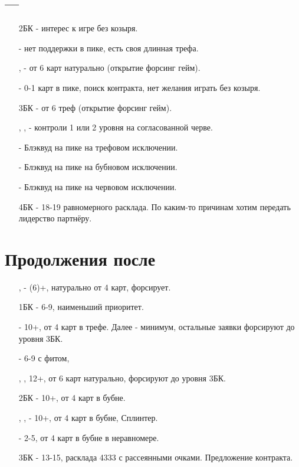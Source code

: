 \documentclass{article}
\begin{document}
\subsection{ --- }
\begin{enumerate}
    \item[2БК] - интерес к игре без козыря.
    \item[\cl{3}] - нет поддержки в пике, есть своя длинная трефа.
    \item[\di{3}, \he{3}] - от 6 карт натурально (открытие форсинг гейм).
    \item[\sp{3}] - 0-1 карт в пике, поиск контракта, нет желания играть без козыря.
    \item[3БК] - от 6 треф (открытие форсинг гейм).
    \item[\cl{4}, \di{4}, \he{4}] - контроли 1 или 2 уровня на согласованной черве.
    \item[\sp{4}] - Блэквуд на пике на трефовом исключении.
    \item[\cl{5}] - Блэквуд на пике на бубновом исключении.
    \item[\di{5}] - Блэквуд на пике на червовом исключении.
    \item[4БК] - 18-19 равномерного расклада. По каким-то причинам хотим передать лидерство партнёру.
\end{enumerate}
\section{Продолжения после }
\begin{enumerate}
    \item[\he{1}, \sp{1}] - (6)+, натурально от 4 карт, форсирует.
    \item[1БК] - 6-9, наименьший приоритет.
    \item[\cl{2}] - 10+, от 4 карт в трефе. Далее  - минимум, остальные заявки форсируют до уровня 3БК.
    \item[\di{2}] - 6-9 с фитом,
    \item[\he{2}, \sp{2}], 12+, от 6 карт натурально, форсируют до уровня 3БК.
    \item[2БК] - 10+, от 4 карт в бубне.
    \item[\cl{3}, \he{3}, \sp{3}] - 10+, от 4 карт в бубне, Сплинтер.
    \item[\di{3}] - 2-5, от 4 карт в бубне в неравномере.
    \item[3БК] - 13-15, расклада 4333 с рассеянными очками. Предложение контракта.
\end{enumerate}
\end{document}
